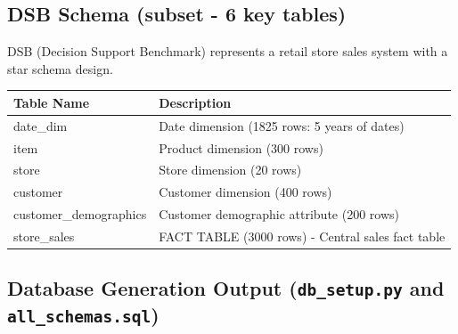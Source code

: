 \documentclass[12pt,a4paper]{article}
\begin{document}
\subsection{DSB Schema (subset - 6 key tables)}
DSB (Decision Support Benchmark) represents a retail store sales system with a star schema design.

\begin{table}[h]
\centering
\begin{tabular}{|l|l|}
\hline
\textbf{Table Name} & \textbf{Description} \\
\hline
date\_dim & Date dimension (1825 rows: 5 years of dates) \\
item & Product dimension (300 rows) \\
store & Store dimension (20 rows) \\
customer & Customer dimension (400 rows) \\
customer\_demographics & Customer demographic attribute (200 rows) \\
store\_sales & FACT TABLE (3000 rows) - Central sales fact table \\
\hline
\end{tabular}
\end{table}

\subsection{Database Generation Output (\texttt{db\_setup.py} and \texttt{all\_schemas.sql})}
\end{document}
